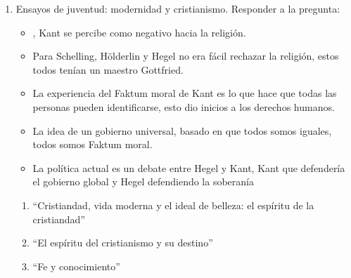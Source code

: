 \begin{enumerate}
    \item Ensayos de juventud: modernidad y cristianismo. Responder a la pregunta:  
        \begin{itemize}
            \item {}, Kant se percibe como negativo hacia la religión. 
            \item Para Schelling, Hölderlin y Hegel no era fácil rechazar la religión, estos todos tenían un maestro Gottfried. 
            \item La experiencia del Faktum moral de Kant es lo que hace que todas las personas pueden identificarse, esto dio inicios a los derechos humanos. 
            \item La idea de un gobierno universal, basado en que todos somos iguales, todos somos Faktum moral. 
            \item La política actual es un debate entre Hegel y Kant, Kant que defendería el gobierno global y Hegel defendiendo la soberanía  
        \end{itemize}
        \begin{enumerate}
            \item ``Cristiandad, vida moderna y el ideal de belleza: el espíritu de la cristiandad'' 
            \item ``El espíritu del cristianismo y su destino''
            \item ``Fe y conocimiento''
        \end{enumerate}
\end{enumerate}
